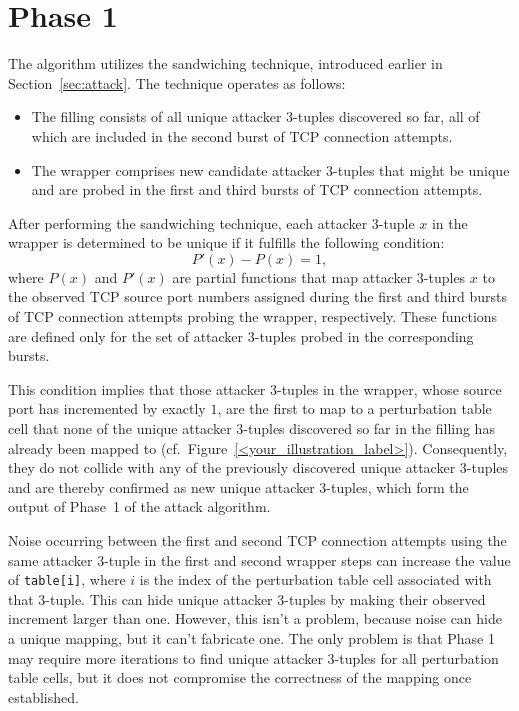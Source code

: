 \documentclass{report}
\begin{document}
\section{Phase 1}
\label{sec:phase 1}

The algorithm utilizes the \alert{sandwiching technique}, introduced earlier in Section~\ref{sec:attack}. The technique operates as follows:

\begin{itemize}
    \item The \alert{filling} consists of all \alert{unique attacker 3-tuples} discovered so far, all of which are included in the second burst of TCP connection attempts.
    \item The \alert{wrapper} comprises new candidate attacker 3-tuples that might be unique and are probed in the first and third bursts of TCP connection attempts.
\end{itemize}

After performing the sandwiching technique, each attacker 3-tuple \( x \) in the wrapper is determined to be \alert{unique} if it fulfills the following \alert{condition}:
\begin{equation}
    P'(x) - P(x) = 1,
\end{equation}
where \(P(x)\) and \(P'(x)\) are partial functions that map \alert{attacker 3-tuples \( x \) to} the observed \alert{TCP source port} numbers assigned during the first and third bursts of TCP connection attempts probing the wrapper, respectively. These functions are defined only for the set of attacker 3-tuples probed in the corresponding bursts.

This \alert{condition implies} that those attacker 3-tuples in the wrapper, whose source port has incremented by exactly $1$, are the first to map to a perturbation table cell that none of the unique attacker 3-tuples discovered so far in the filling has already been mapped to (cf.\ Figure~\ref{<your_illustration_label>}). Consequently, they do not collide with any of the previously discovered unique attacker 3-tuples and are thereby confirmed as new \alert{unique attacker 3-tuples}, which form the \alert{output} of Phase~1 of the attack algorithm.

\alert{Noise} occurring between the first and second TCP connection attempts using the same attacker 3-tuple in the first and second wrapper steps can increase the value of \texttt{table[i]}, where $i$ is the index of the perturbation table cell associated with that 3-tuple. This \alert{can hide} unique attacker 3-tuples by making their observed increment larger than one. However, this isn’t a problem, because noise can hide a unique mapping, but it \alert{can’t fabricate} one. The only problem is that Phase 1 may require more iterations to find unique attacker 3-tuples for all perturbation table cells, but it does not compromise the correctness of the mapping once established.
\end{document}
